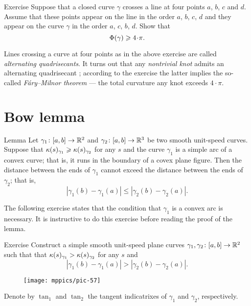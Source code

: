 \begin{thm}{Exercise}\label{ex:quadrisecant}
Suppose that a closed curve $\gamma$ crosses a line at four points $a$, $b$, $c$ and $d$.
Assume that these points appear on the line in the order $a$, $b$, $c$, $d$
and they appear on the curve $\gamma$ in the order $a$, $c$, $b$, $d$.
Show that 
\[\tc\gamma\ge 4\cdot\pi.\]

\end{thm}

Lines crossing a curve at four points as in the above exercise are called \emph{alternating quadrisecants}.
It turns out that any \emph{nontrivial knot} admits an alternating quadrisecant \cite{denne};
according to the exercise the latter implies the so-called \emph{F\'ary--Milnor theorem} --- the total curvature any knot exceeds $4\cdot \pi$.

\section*{Bow lemma}

\begin{thm}{Lemma}\label{lem:bow}
Let $\gamma_1\colon[a,b]\to\mathbb{R}^2$ and $\gamma_2\colon[a,b] \to\mathbb{R}^3$ be two smooth unit-speed curves.
Suppose that $\kappa(s)_{\gamma_1}\geqslant\kappa(s)_{\gamma_2}$ for any $s$ 
and the curve
$\gamma_1$ is a simple arc of a convex curve; that is, it runs in the boundary of a covex plane figure.
Then the distance between the ends of $\gamma_1$ cannot exceed the  distance between the ends of $\gamma_2$; that is,
\[|\gamma_1(b)-\gamma_1(a)|\le |\gamma_2(b)-\gamma_2(a)|.\]

\end{thm}

The following exercise states that the condition that $\gamma_1$ is a convex arc is necessary.
It is instructive to do this exercise before reading the proof of the lemma.

\begin{thm}{Exercise}\label{ex:anti-bow}
Construct a simple smooth unit-speed plane curves $\gamma_1,\gamma_2\colon[a,b]\to\mathbb{R}^2$ such that 
that $\kappa(s)_{\gamma_1}>\kappa(s)_{\gamma_2}$ for any $s$ and
\[|\gamma_1(b)-\gamma_1(a)|> |\gamma_2(b)-\gamma_2(a)|.\]
\end{thm}


\begin{wrapfigure}{o}{36 mm}
\vskip-7mm
\centering
\texttt{[image: mppics/pic-57]}
\vskip0mm
\end{wrapfigure}

Denote by $\tan_1$ and $\tan_2$ the tangent indicatrixes of $\gamma_1$ and $\gamma_2$, respectively.

